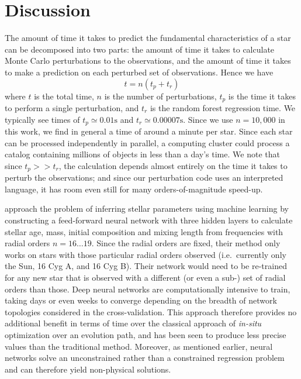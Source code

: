 \documentclass[manuscript]{aastex}
\begin{document}
\section{Discussion}
The amount of time it takes to predict the fundamental characteristics of a star can be decomposed into two parts: the amount of time it takes to calculate Monte Carlo perturbations to the observations, and the amount of time it takes to make a prediction on each perturbed set of observations. Hence we have
\begin{equation}
    t = n(t_p + t_r)
\end{equation}
where $t$ is the total time, $n$ is the number of perturbations, $t_p$ is the time it takes to perform a single perturbation, and $t_r$ is the random forest regression time. We typically see times of $t_p \simeq 0.01 \si{\s}$ and $t_r \simeq 0.00007 \si{\s}$. Since we use $n=10,000$ in this work, we find in general a time of around a minute per star. Since each star can be processed independently in parallel, a computing cluster could process a catalog containing millions of objects in less than a day's time. We note that since $t_p >> t_r$, the calculation depends almost entirely on the time it takes to perturb the observations; and since our perturbation code uses an interpreted language, it has room even still for many orders-of-magnitude speed-up. 

\citet{2016arXiv160200902V} approach the problem of inferring stellar parameters using machine learning by constructing a feed-forward neural network with three hidden layers to calculate stellar age, mass, initial composition and mixing length from frequencies with radial orders $n=16\ldots 19$. Since the radial orders are fixed, their method only works on stars with those particular radial orders observed (i.e.~currently only the Sun, 16 Cyg A, and 16 Cyg B). Their network would need to be re-trained for any new star that is observed with a different (or even a sub-) set of radial orders than those. Deep neural networks are computationally intensive to train, taking days or even weeks to converge depending on the breadth of network topologies considered in the cross-validation. This approach therefore provides no additional benefit in terms of time over the classical approach of \emph{in-situ} optimization over an evolution path, and has been seen to produce less precise values than the traditional method.%
Moreover, as mentioned earlier, neural networks solve an unconstrained rather than a constrained regression problem and can therefore yield non-physical solutions. 
\end{document}
